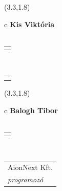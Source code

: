 \documentclass[11pt]{article}
\begin{document}
\makebox(3.3,1.8){
  \renewcommand\arraystretch{1.3}
  \begin{tabular}[c]{c}
    \hspace{8.5mm}
    \LARGE\bf{ Kis Viktória }\\
    \hspace{8.5mm}
    \Large{  }\\
    \renewcommand\arraystretch{3}
    \begin{tabular}[c]{c}
      \centering
      \fontfamily{phv}\selectfont{
        \textbf{
          \textsc{
            \scriptsize{
            \color{Dark}{ Ismerkedő }\color{Bright}{ Webmester }\color{Bright}{ Sminkmester }\color{Bright}{ Programozó }
            }
          }
        }
      }
    \end{tabular}
    \\
    \renewcommand\arraystretch{1}
    \begin{tabular}{p{3.3in}}
      \hspace{.7cm}\\
      \hspace{.7cm}\emph{  }\\
    \end{tabular}
  \end{tabular}
}

\makebox(3.3,1.8){
  \renewcommand\arraystretch{1.3}
  \begin{tabular}[c]{c}
    \hspace{8.5mm}
    \LARGE\bf{ Balogh Tibor }\\
    \hspace{8.5mm}
    \Large{  }\\
    \renewcommand\arraystretch{3}
    \begin{tabular}[c]{c}
      \centering
      \fontfamily{phv}\selectfont{
        \textbf{
          \textsc{
            \scriptsize{
            \color{Bright}{ Ismerkedő }\color{Bright}{ Webmester }\color{Bright}{ Sminkmester }\color{Dark}{ Programozó }
            }
          }
        }
      }
    \end{tabular}
    \\
    \renewcommand\arraystretch{1}
    \begin{tabular}{p{3.3in}}
      \hspace{.7cm}AionNext Kft.\\
      \hspace{.7cm}\emph{ programozó }\\
    \end{tabular}
  \end{tabular}
}
\end{document}
